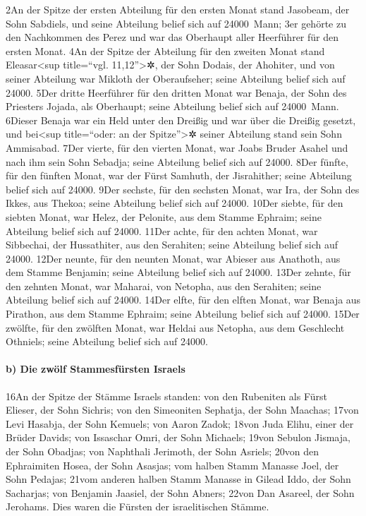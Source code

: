 2An der Spitze der ersten Abteilung für den ersten Monat stand Jasobeam,
der Sohn Sabdiels, und seine Abteilung belief sich auf 24000~Mann; 3er
gehörte zu den Nachkommen des Perez und war das Oberhaupt aller
Heerführer für den ersten Monat. 4An der Spitze der Abteilung für den
zweiten Monat stand Eleasar\textless sup title=``vgl.
11,12''\textgreater✲, der Sohn Dodais, der Ahohiter, und von seiner
Abteilung war Mikloth der Oberaufseher; seine Abteilung belief sich auf
24000. 5Der dritte Heerführer für den dritten Monat war Benaja, der Sohn
des Priesters Jojada, als Oberhaupt; seine Abteilung belief sich auf
24000~Mann. 6Dieser Benaja war ein Held unter den Dreißig und war über
die Dreißig gesetzt, und bei\textless sup title=``oder: an der
Spitze''\textgreater✲ seiner Abteilung stand sein Sohn Ammisabad. 7Der
vierte, für den vierten Monat, war Joabs Bruder Asahel und nach ihm sein
Sohn Sebadja; seine Abteilung belief sich auf 24000. 8Der fünfte, für
den fünften Monat, war der Fürst Samhuth, der Jisrahither; seine
Abteilung belief sich auf 24000. 9Der sechste, für den sechsten Monat,
war Ira, der Sohn des Ikkes, aus Thekoa; seine Abteilung belief sich auf
24000. 10Der siebte, für den siebten Monat, war Helez, der Pelonite, aus
dem Stamme Ephraim; seine Abteilung belief sich auf 24000. 11Der achte,
für den achten Monat, war Sibbechai, der Hussathiter, aus den Serahiten;
seine Abteilung belief sich auf 24000. 12Der neunte, für den neunten
Monat, war Abieser aus Anathoth, aus dem Stamme Benjamin; seine
Abteilung belief sich auf 24000. 13Der zehnte, für den zehnten Monat,
war Maharai, von Netopha, aus den Serahiten; seine Abteilung belief sich
auf 24000. 14Der elfte, für den elften Monat, war Benaja aus Pirathon,
aus dem Stamme Ephraim; seine Abteilung belief sich auf 24000. 15Der
zwölfte, für den zwölften Monat, war Heldai aus Netopha, aus dem
Geschlecht Othniels; seine Abteilung belief sich auf 24000.

\hypertarget{b-die-zwuxf6lf-stammesfuxfcrsten-israels}{%
\paragraph{b) Die zwölf Stammesfürsten
Israels}\label{b-die-zwuxf6lf-stammesfuxfcrsten-israels}}

16An der Spitze der Stämme Israels standen: von den Rubeniten als Fürst
Elieser, der Sohn Sichris; von den Simeoniten Sephatja, der Sohn
Maachas; 17von Levi Hasabja, der Sohn Kemuels; von Aaron Zadok; 18von
Juda Elihu, einer der Brüder Davids; von Issaschar Omri, der Sohn
Michaels; 19von Sebulon Jismaja, der Sohn Obadjas; von Naphthali
Jerimoth, der Sohn Asriels; 20von den Ephraimiten Hosea, der Sohn
Asasjas; vom halben Stamm Manasse Joel, der Sohn Pedajas; 21vom anderen
halben Stamm Manasse in Gilead Iddo, der Sohn Sacharjas; von Benjamin
Jaasiel, der Sohn Abners; 22von Dan Asareel, der Sohn Jerohams. Dies
waren die Fürsten der israelitischen Stämme.

